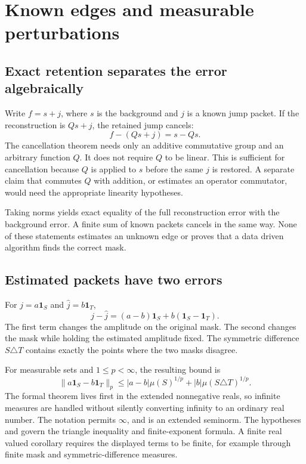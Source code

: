 \section{Known edges and measurable perturbations}
\subsection{Exact retention separates the error algebraically}
Write $f=s+j$, where $s$ is the background and $j$ is a known jump packet. If the reconstruction is $Qs+j$, the retained jump cancels:
\[
f-(Qs+j)=s-Qs.
\]
The cancellation theorem needs only an additive commutative group and an arbitrary function $Q$. It does not require $Q$ to be linear. This is sufficient for cancellation because $Q$ is applied to $s$ before the same $j$ is restored. A separate claim that commutes $Q$ with addition, or estimates an operator commutator, would need the appropriate linearity hypotheses.

Taking norms yields exact equality of the full reconstruction error with the background error. A finite sum of known packets cancels in the same way. None of these statements estimates an unknown edge or proves that a data driven algorithm finds the correct mask.

\subsection{Estimated packets have two errors}
For $j=a\mathbf1_S$ and $\widehat j=b\mathbf1_T$,
\[
j-\widehat j=(a-b)\mathbf1_S+b(\mathbf1_S-\mathbf1_T).
\]
The first term changes the amplitude on the original mask. The second changes the mask while holding the estimated amplitude fixed. The symmetric difference $S\triangle T$ contains exactly the points where the two masks disagree.

For measurable sets and $1\le p<\infty$, the resulting bound is
\[
\|a\mathbf1_S-b\mathbf1_T\|_p
\le |a-b|\mu(S)^{1/p}+|b|\mu(S\triangle T)^{1/p}.
\]
The formal theorem lives first in the extended nonnegative reals, so infinite measures are handled without silently converting infinity to an ordinary real number.
The notation  permits $\infty$, and  is an extended seminorm. The hypotheses  and  govern the triangle inequality and finite-exponent formula. A finite real valued corollary requires the displayed terms to be finite, for example through finite mask and symmetric-difference measures.

